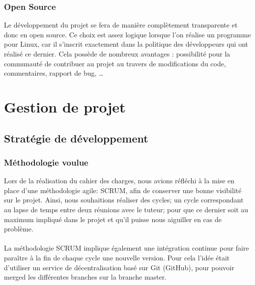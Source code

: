 \documentclass[french]{report}
\begin{document}
\subsection{Open Source}
Le développement du projet se fera de manière complètement transparente et donc
en open source. Ce choix est assez logique lorsque l’on réalise un programme
pour Linux, car il s’inscrit exactement dans la politique des développeurs qui
ont réalisé ce dernier. Cela possède de nombreux avantages : possibilité pour
la communauté de contribuer au projet au travers de modifications du code,
commentaires, rapport de bug, \ldots

\chapter{Gestion de projet}

\newpage

\section{Stratégie de développement}

\subsection{Méthodologie voulue}
Lors de la réalisation du cahier des charges, nous avions réfléchi à la mise en
place d'une méthodologie agile: SCRUM, afin de conserver une bonne visibilité sur le
projet. Ainsi, nous souhaitions réaliser des cycles; un cycle correspondant au
lapse de temps entre deux réunions avec le tuteur; pour que ce dernier soit au
maximum impliqué dans le projet et qu'il puisse nous aiguiller en cas de problème.
\\
\\
La méthodologie SCRUM implique également une intégration continue pour faire
paraître à la fin de chaque cycle une nouvelle version. Pour cela l'idée était
d'utiliser un service de décentralisation basé sur Git (GitHub), pour pouvoir merged les
différentes branches sur la branche master.
\end{document}
